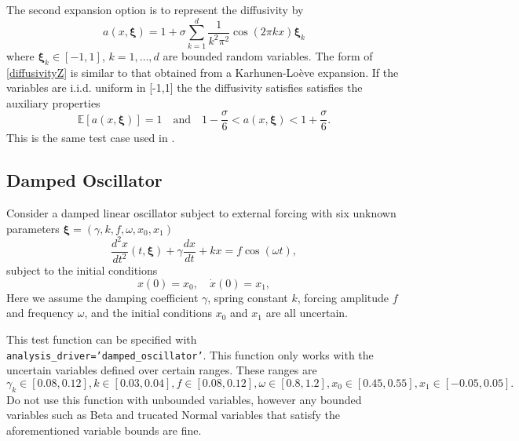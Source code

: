 The second expansion option is to represent the diffusivity by
\begin{equation}\label{diffusivityZ}
a(x,\boldsymbol{\xi})=1+\sigma\sum_{k=1}^d\frac{1}{k^2\pi^2}\cos(2\pi kx)\boldsymbol{\xi}_k
\end{equation}
where $\boldsymbol{\xi}_k\in[-1,1]$, $k=1,\ldots,d$ are bounded random variables. The form of \eqref{diffusivityZ} is
similar to that obtained from a Karhunen-Lo\`{e}ve expansion. If the
variables are i.i.d. uniform in [-1,1] the the diffusivity satisfies
satisfies the auxiliary properties
\begin{equation}
\mathbb{E}[a(x,\boldsymbol{\xi})]=1\quad\text{and}\quad 1-\frac{\sigma}{6}<a(x,\boldsymbol{\xi})<1+\frac{\sigma}{6}.
\end{equation}
This is the same test case used in \cite{Xiu_Hesthaven_05}.


\subsection{Damped Oscillator}
Consider a damped linear oscillator subject to external forcing
with six unknown parameters $\boldsymbol{\xi}=(\gamma,k,f,\omega,x_0,x_1)$
\begin{equation}\label{eq:oscillator_ode}
\frac{d^2x}{dt^2}(t,\boldsymbol{\xi})+\gamma\frac{dx}{dt}+k x=f\cos(\omega t),
\end{equation}
subject to the initial conditions
\begin{equation}
x(0)=x_0,\quad \dot{x}(0)=x_1,
\end{equation}
Here we assume the damping coefficient $\gamma$, spring constant $k$,
forcing amplitude $f$ and frequency $\omega$, and the initial
conditions $x_0$ and $x_1$ are all uncertain.

This test function can be specified with {\tt
  analysis\_driver='damped\_oscillator'}. This function only works with
the uncertain variables defined over certain ranges. These ranges
are
$$\gamma_k\in[0.08,0.12],k\in[0.03,0.04],f\in[0.08,0.12],\omega\in[0.8,1.2],x_0\in[0.45,0.55],x_1\in[-0.05,0.05].$$
Do not use this function with unbounded variables, however any
bounded variables such as Beta and trucated Normal variables that
satisfy the aforementioned variable bounds are fine.

